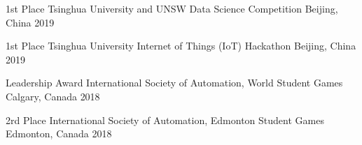 



\begin{cvhonors}

  \cvhonor
    {1st Place} %
    {Tsinghua University and UNSW Data Science Competition} %
    {Beijing, China} %
    {2019} %

  \cvhonor
    {1st Place} %
    {Tsinghua University Internet of Things (IoT) Hackathon} %
    {Beijing, China} %
    {2019} %

\end{cvhonors}




\begin{cvhonors}
 \cvhonor
 {Leadership Award} %
 {International Society of Automation, World Student Games} %
 {Calgary, Canada} %
 {2018} %
 
  \cvhonor
    {2rd Place} %
    {International Society of Automation, Edmonton Student Games} %
    {Edmonton, Canada} %
    {2018} %

\end{cvhonors}
